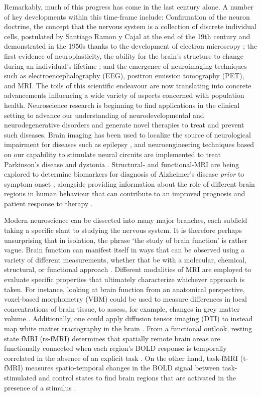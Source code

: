 Remarkably, much of this progress has come in the last century alone. A number of key developments within this time-frame include: Confirmation of the neuron doctrine, the concept that the nervous system is a collection of discrete individual cells, postulated by Santiago Ramon y Cajal at the end of the 19th century and demonstrated in the 1950s thanks to the development of electron microscopy \citep{Lopez-Munoz2006-zk}; the first evidence of neuroplasticity, the ability for the brain's structure to change during an individual's lifetime \citep{Diamond1964-cu, Bennett1964-vx}; and the emergence of neuroimaging techniques such as electroencephalography (EEG), positron emission tomography (PET), and MRI. The toils of this scientific endeavour are now translating into concrete advancements influencing a wide variety of aspects concerned with population health. Neuroscience research is beginning to find applications in the clinical setting to advance our understanding of neurodevelopmental and neurodegenerative disorders and generate novel therapies to treat and prevent such diseases. Brain imaging has been used to localize the source of neurological impairment for diseases such as epilepsy \citep{Stacey2008-qx}, and neuroengineering techniques based on our capability to stimulate neural circuits are implemented to treat Parkinson's disease \citep{Kalia2013-bv} and dystonia \citep{Fox2015-ds}. Structural- and functional-MRI are being explored to determine biomarkers for diagnosis of Alzheimer's disease \textit{prior} to symptom onset \citep{Sperling2014-sy, McEvoy2009-zx}, alongside providing information about the role of different brain regions in human behaviour that can contribute to an improved prognosis and patient response to therapy \citep{Matthews2006-sl}.  

Modern neuroscience can be dissected into many major branches, each subfield taking a specific slant to studying the nervous system. It is therefore perhaps unsurprising that in isolation, the phrase `the study of brain function' is rather vague. Brain function can manifest itself in ways that can be observed using a variety of different measurements, whether that be with a molecular, chemical, structural, or functional approach \citep{Hargreaves2012-dz}. Different modalities of MRI are employed to evaluate specific properties that ultimately characterize whichever approach is taken. For instance, looking at brain function from an anatomical perspective, voxel-based morphometry (VBM) could be used to measure differences in local concentrations of brain tissue, to assess, for example, changes in grey matter volume \citep{Mechelli2005-dn}. Additionally, one could apply diffusion tensor imaging (DTI) to instead map white matter tractography in the brain \citep{Alexander2007-ut, Soares2013-mh}. From a functional outlook, resting state fMRI (rs-fMRI) determines that spatially remote brain areas are functionally connected when each region's BOLD response is temporally correlated in the absence of an explicit task \citep{Lee2013-kn}. On the other hand, task-fMRI (t-fMRI) measures spatio-temporal changes in the BOLD signal between task-stimulated and control states to find brain regions that are activated in the presence of a stimulus \citep{Glover2011-at}. 

